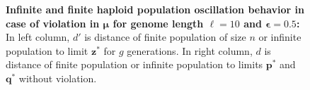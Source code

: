 \begin{figure}[h]
\begin{center}
\hspace{-3em}%
\vspace{-0.5em} \hspace{-3em}%


\caption{\textbf{Infinite and finite haploid population oscillation behavior in case of violation in $\bm{\mu}$ for genome length $\ell = 10$ and $\bm{\epsilon} = 0.5$:} 
  In left column, $d'$ is distance of finite population of size $n$ or infinite population to limit $\bm{z}^\ast$ for $g$ generations. In right column, $d$ is distance of finite population or infinite population to limits $\bm{p}^\ast$ and $\bm{q}^\ast$ without violation.}
\label{oscillation_10h_vio_mu_0.5}
\end{center}
\end{figure}

